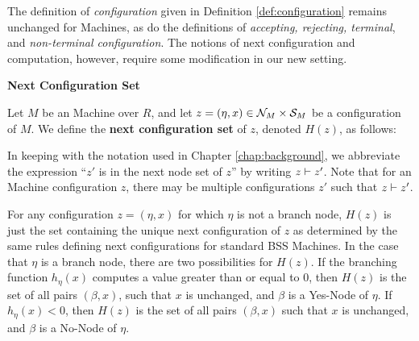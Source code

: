 The definition of \emph{configuration} given in Definition
\ref{def:configuration} remains unchanged for \ndet Machines, as do
the definitions of \emph{accepting, rejecting, terminal}, and
\emph{non-terminal configuration}. The notions of next configuration
and computation, however, require some modification in our new
setting.

\begin{definition}{\textbf{Next Configuration Set}}

  Let $M$ be an \ndet Machine over $R$, and let $z = (\eta, x) \in
  \mathcal{N}_M \times \mathcal{S}_M$ be a configuration of $M$.  We define
  the \textbf{next configuration set} of $z$, denoted $H(z)$, as
  follows:


  In keeping with the notation used in Chapter \ref{chap:background},
  we abbreviate the expression ``$z'$ is in the next node set of $z$''
  by writing $z \vdash z'$.  Note that for an \ndet Machine
  configuration $z$, there may be multiple configurations $z'$ such
  that $z \vdash z'$.
\end{definition}

\vspace{\baselineskip}

For any configuration $z = (\eta, x)$ for which $\eta$ is not a branch
node, $H(z)$ is just the set containing the unique next configuration
of $z$ as determined by the same rules defining next configurations
for standard BSS Machines. In the case that $\eta$ is a branch node,
there are two possibilities for $H(z)$.  If the branching function
$h_\eta(x)$ computes a value greater than or equal to $0$, then $H(z)$
is the set of all pairs $(\beta, x)$, such that $x$ is unchanged, and
$\beta$ is a Yes-Node of $\eta$.  If $h_\eta(x) < 0$, then $H(z)$ is
the set of all pairs $(\beta, x)$ such that $x$ is unchanged, and
$\beta$ is a No-Node of $\eta$.

